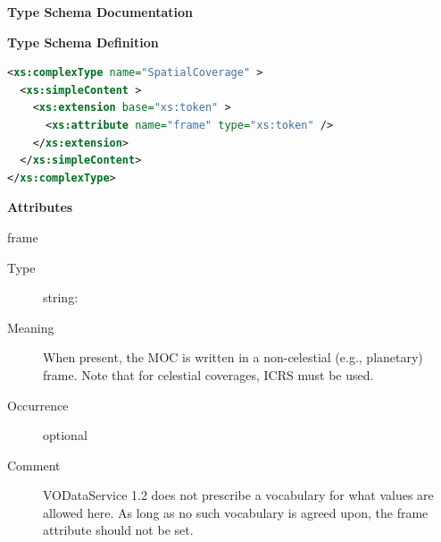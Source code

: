 \documentclass[11pt,a4paper]{ivoa}
\begin{document}
\begin{generated}
\begingroup
      	\renewcommand*\descriptionlabel[1]{%
      	\hbox to 5.5em{\emph{#1}\hfil}}\vspace{2ex}\noindent\textbf{ Type Schema Documentation}


\vspace{1ex}\noindent\textbf{ Type Schema Definition}

\begin{lstlisting}[language=XML,basicstyle=\footnotesize]
<xs:complexType name="SpatialCoverage" >
  <xs:simpleContent >
    <xs:extension base="xs:token" >
      <xs:attribute name="frame" type="xs:token" />
    </xs:extension>
  </xs:simpleContent>
</xs:complexType>
\end{lstlisting}

\vspace{0.5ex}\noindent\textbf{ Attributes}

\begingroup\small\begin{bigdescription}
\item[frame]
\begin{description}
\item[Type] string: 
\item[Meaning] 
                     When present, the MOC is written in a non-celestial (e.g., 
                     planetary) frame.  Note that for celestial coverages,
                     ICRS must be used.
                  
\item[Occurrence] optional
\item[Comment] 
                     VODataService 1.2 does not prescribe a vocabulary for 
                     what values are allowed here.  As
                     long as no such vocabulary is agreed upon, the frame
                     attribute should not be set.
                  
\end{description}


\end{bigdescription}\endgroup

\endgroup
\end{generated}
\end{document}
